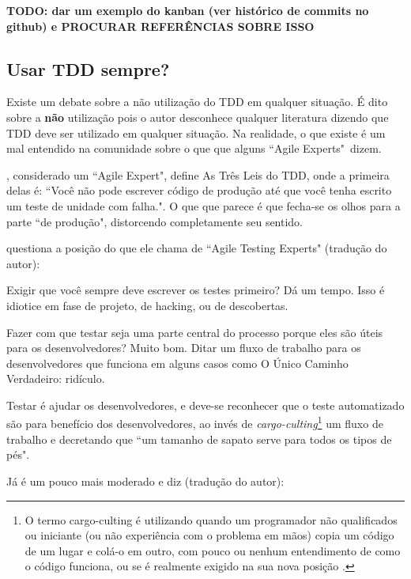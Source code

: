 \textbf{TODO: dar um exemplo do kanban (ver histórico de commits no github) e PROCURAR REFERÊNCIAS SOBRE ISSO}


\subsection{Usar TDD sempre?} %
\label{sec:usar_tdd_sempre_}

Existe um debate sobre a não utilização do TDD em qualquer situação. É dito sobre a \textbf{não} utilização pois o autor desconhece qualquer literatura dizendo que TDD deve ser utilizado em qualquer situação. Na realidade, o que existe é um mal entendido na comunidade sobre o que que alguns ``Agile Experts"\ dizem.

, considerado um ``Agile Expert", define As Três Leis do TDD, onde a primeira delas é: ``Você não pode escrever código de produção até que você tenha escrito um teste de unidade com falha.". O que que parece é que fecha-se os olhos para a parte ``de produção", distorcendo completamente seu sentido.

 questiona a posição do que ele chama de ``Agile Testing Experts" (tradução do autor):

\begin{citacao}
Exigir que você sempre deve escrever os testes primeiro? Dá um tempo. Isso é idiotice em fase de projeto, de hacking, ou de descobertas.

Fazer com que testar seja uma parte central do processo porque eles são úteis para os desenvolvedores? Muito bom. Ditar um fluxo de trabalho para os desenvolvedores que funciona em alguns casos como O Único Caminho Verdadeiro: ridículo.

Testar é ajudar os desenvolvedores, e deve-se reconhecer que o teste automatizado são para benefício dos desenvolvedores, ao invés de \textit{cargo-culting}\footnote{O termo cargo-culting é utilizando quando um programador não qualificados ou iniciante (ou não experiência com o problema em mãos) copia um código de um lugar e colá-o em outro, com pouco ou nenhum entendimento de como o código funciona, ou se é realmente exigido na sua nova posição \cite{CargoCulting}.} um fluxo de trabalho e decretando que ``um tamanho de sapato serve para todos os tipos de pés".
\end{citacao}

Já  é um pouco mais moderado e diz (tradução do autor):

